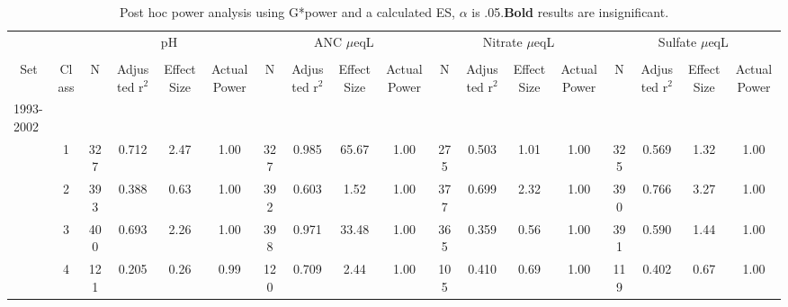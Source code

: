 \begin{sidewaystable}[p]\footnotesize
\caption{Post hoc power analysis using G*power and a calculated ES, $\alpha$ is .05.\textbf{Bold} results are insignificant.}
\begin{tabular}{p{1cm}p{.5cm}cccccccccccccccc}
\hline\noalign{\smallskip}
\multicolumn{1}{c}{}&\multicolumn{1}{c}{}  & \multicolumn{4}{c}{pH} &\multicolumn{4}{c}{ ANC $\mu$eqL} & \multicolumn{4}{c}{ Nitrate $\mu$eqL} &  \multicolumn{4}{c}{Sulfate $\mu$eqL}  \\ \cline{3-18}\noalign{\smallskip}
 & \multicolumn{ 1}{c}{} & \multicolumn{ 1}{c}{} &  \\ 
 \multicolumn{ 1}{c}{Set} & \multicolumn{ 1}{c}{Class} & \multicolumn{ 1}{c}{N} & \multicolumn{ 1}{p{1.2cm}}{Adjusted r$^2$} & \multicolumn{ 1}{p{1cm}}{Effect Size} & \multicolumn{ 1}{p{1cm}}{Actual Power} & \multicolumn{ 1}{c}{N} & \multicolumn{ 1}{p{1.2cm}}{Adjusted r$^2$} & \multicolumn{ 1}{p{1cm}}{Effect Size} & \multicolumn{ 1}{p{1cm}}{Actual Power} & \multicolumn{ 1}{c}{N} & \multicolumn{ 1}{p{1.2cm}}{Adjusted r$^2$} & \multicolumn{ 1}{p{1cm}}{Effect Size} & \multicolumn{ 1}{p{1cm}}{Actual Power} & \multicolumn{ 1}{c}{N} & \multicolumn{ 1}{p{1.2cm}}{Adjusted r$^2$} & \multicolumn{ 1}{p{1cm}}{Effect Size}& \multicolumn{1}{p{1cm}}{Actual Power} \\ \hline\noalign{\smallskip}
1993-2002\\
 & \multicolumn{1}{c}{1} & 327 & \multicolumn{ 1}{c}{0.712} & \multicolumn{ 1}{c}{2.47} & \multicolumn{ 1}{c}{1.00} & \multicolumn{ 1}{c}{327} & \multicolumn{ 1}{c}{0.985} & \multicolumn{ 1}{c}{65.67} & \multicolumn{ 1}{c}{1.00} & \multicolumn{ 1}{c}{275} & \multicolumn{ 1}{c}{0.503} & \multicolumn{ 1}{c}{1.01} & \multicolumn{ 1}{c}{1.00} & \multicolumn{ 1}{c}{325} & \multicolumn{ 1}{c}{0.569} & \multicolumn{ 1}{c}{1.32} & \multicolumn{ 1}{c}{1.00} \\ 
 & \multicolumn{ 1}{c}{2} & 393 & 0.388  & 0.63  & 1.00  & 392 & 0.603  & 1.52  & 1.00  & 377 & 0.699  & 2.32  & 1.00  & 390 & 0.766  & 3.27  & 1.00  \\ 
 & \multicolumn{ 1}{c}{3} & 400 & 0.693  & 2.26  & 1.00  & 398 & 0.971  & 33.48  & 1.00  & 365 & 0.359  & 0.56  & 1.00  & 391 & 0.590  & 1.44  & 1.00  \\ 
 & \multicolumn{ 1}{c}{4} & 121 & 0.205  & 0.26  & 0.99  & 120 & 0.709  & 2.44  & 1.00  & 105 & 0.410  & 0.69  & 1.00  & 119 & 0.402  & 0.67  & 1.00  \\ 

\end{tabular}
\end{sidewaystable}
